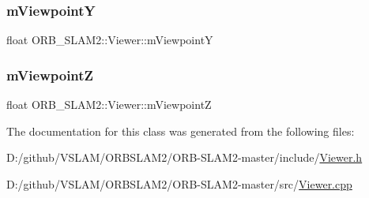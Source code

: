 \subsubsection{\texorpdfstring{m\+ViewpointY}{mViewpointY}}
{\footnotesize\ttfamily float O\+R\+B\+\_\+\+S\+L\+A\+M2\+::\+Viewer\+::m\+ViewpointY\hspace{0.3cm}{\ttfamily [private]}}

\mbox{\label{class_o_r_b___s_l_a_m2_1_1_viewer_af73493d3e6c2d7664e8c0d7884d6a485}} 
\subsubsection{\texorpdfstring{m\+ViewpointZ}{mViewpointZ}}
{\footnotesize\ttfamily float O\+R\+B\+\_\+\+S\+L\+A\+M2\+::\+Viewer\+::m\+ViewpointZ\hspace{0.3cm}{\ttfamily [private]}}



The documentation for this class was generated from the following files\+:\begin{DoxyCompactItemize}
\item 
D\+:/github/\+V\+S\+L\+A\+M/\+O\+R\+B\+S\+L\+A\+M2/\+O\+R\+B-\/\+S\+L\+A\+M2-\/master/include/\mbox{\hyperlink{_viewer_8h}{Viewer.\+h}}\item 
D\+:/github/\+V\+S\+L\+A\+M/\+O\+R\+B\+S\+L\+A\+M2/\+O\+R\+B-\/\+S\+L\+A\+M2-\/master/src/\mbox{\hyperlink{_viewer_8cpp}{Viewer.\+cpp}}\end{DoxyCompactItemize}
